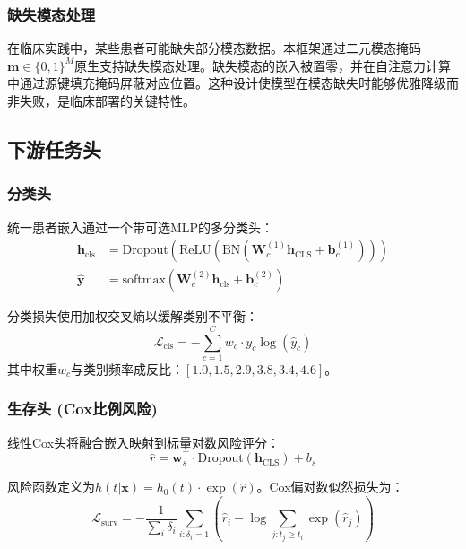 \documentclass[conference]{IEEEtran}
\begin{document}
\subsubsection{缺失模态处理}

在临床实践中，某些患者可能缺失部分模态数据。本框架通过二元模态掩码$\mathbf{m} \in \{0, 1\}^M$原生支持缺失模态处理。缺失模态的嵌入被置零，并在自注意力计算中通过源键填充掩码屏蔽对应位置。这种设计使模型在模态缺失时能够优雅降级而非失败，是临床部署的关键特性。

\subsection{下游任务头}
\label{sec:heads}

\subsubsection{分类头}

统一患者嵌入通过一个带可选MLP的多分类头：
\begin{equation}
\begin{aligned}
\mathbf{h}_{\text{cls}} &= \text{Dropout}(\text{ReLU}(\text{BN}(\mathbf{W}_c^{(1)} \mathbf{h}_{\text{CLS}} + \mathbf{b}_c^{(1)}))) \\
\hat{\mathbf{y}} &= \text{softmax}(\mathbf{W}_c^{(2)} \mathbf{h}_{\text{cls}} + \mathbf{b}_c^{(2)})
\end{aligned}
\end{equation}

分类损失使用加权交叉熵以缓解类别不平衡：
\begin{equation}
\mathcal{L}_{\text{cls}} = -\sum_{c=1}^{C} w_c \cdot y_c \log(\hat{y}_c)
\end{equation}
其中权重$w_c$与类别频率成反比：$[1.0, 1.5, 2.9, 3.8, 3.4, 4.6]$。

\subsubsection{生存头 (Cox比例风险)}

线性Cox头将融合嵌入映射到标量对数风险评分：
\begin{equation}
\hat{r} = \mathbf{w}_s^\top \cdot \text{Dropout}(\mathbf{h}_{\text{CLS}}) + b_s
\end{equation}

风险函数定义为$h(t|\mathbf{x}) = h_0(t) \cdot \exp(\hat{r})$。Cox偏对数似然损失为：
\begin{equation}
\mathcal{L}_{\text{surv}} = -\frac{1}{\sum_i \delta_i} \sum_{i: \delta_i = 1} \left( \hat{r}_i - \log \sum_{j: t_j \geq t_i} \exp(\hat{r}_j) \right)
\end{equation}
\end{document}

